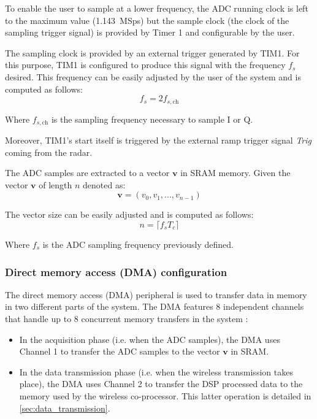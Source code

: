 To enable the user to sample at a lower frequency, the ADC running clock is left to the maximum value (\SI{1.143}{MSps}) but the sample clock (the clock of the sampling trigger signal) is provided by Timer 1 and configurable by the user.

The sampling clock is provided by an external trigger generated by TIM1. For this purpose, TIM1 is configured to produce this signal with the frequency $f_{s}$ desired. This frequency can be easily adjusted by the user of the system and is computed as follows:
\begin{equation}
	f_s = 2 f_{s,\mathrm{ch}}
\end{equation}

Where $f_{s,\mathrm{ch}}$ is the sampling frequency necessary to sample I or Q.

Moreover, TIM1's start itself is triggered by the external ramp trigger signal \textit{Trig} coming from the radar.

The ADC samples are extracted to a vector $\mathbf{v}$ in SRAM memory. Given the vector $\mathbf{v}$ of length $n$ denoted as:
\begin{equation}
 \mathbf{v} = (v_0, v_1, ..., v_{n-1})
\end{equation}

The vector size can be easily adjusted and is computed as follows:
\begin{equation}
	n = \lceil f_s T_c \rceil
\end{equation}

Where $f_s$ is the ADC sampling frequency previously defined.

\subsubsection{Direct memory access (DMA) configuration} \label{sec:dma}

The direct memory access (DMA) peripheral is used to transfer data in memory in two different parts of the system. The DMA features 8 independent channels that handle up to 8 concurrent memory transfers in the system \cite{STMicroelectronics2022}:
\begin{itemize}
	\item In the acquisition phase (i.e. when the ADC samples), the DMA uses Channel 1 to transfer the ADC samples to the vector $\mathbf{v}$ in SRAM.
	\item In the data transmission phase (i.e. when the wireless transmission takes place), the DMA uses Channel 2 to transfer the DSP processed data to the memory used by the wireless co-processor. This latter operation is detailed in \cref{sec:data_transmission}.
\end{itemize}

